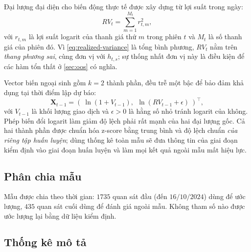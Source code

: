 \documentclass[12pt,a4paper]{article}
\numberwithin{equation}{section}
\theoremstyle{definition}
\newcommand{\Xvec}{\symbf{X}}
\begin{document}
Đại lượng đại diện cho biến động thực tế được xây dựng từ lợi suất trong ngày:
\begin{equation}
  RV_t=\sum_{m=1}^{M_t} r_{t,m}^{2},
  \label{eq:realized-variance}
\end{equation}
với $r_{t,m}$ là lợi suất logarit của thanh giá thứ $m$ trong phiên $t$ và $M_t$ là số
thanh giá của phiên đó. Vì \eqref{eq:realized-variance} là tổng bình phương, $RV_t$ nằm
trên \emph{thang phương sai}, cùng đơn vị với $h_{t,s}$; sự thống nhất đơn vị này là điều
kiện để các hàm tổn thất ở \cref{sec:oos} có nghĩa.

Vector biến ngoại sinh gồm $k=2$ thành phần, đều trễ một bậc để bảo đảm khả dụng tại thời
điểm lập dự báo:
\begin{equation}
  \Xvec_{t-1}=\left(\ \ln\!\left(1+V_{t-1}\right),\ \ \ln\!\left(RV_{t-1}+\epsilon\right)\ \right)^{\!\top},
  \label{eq:exog}
\end{equation}
với $V_{t-1}$ là khối lượng giao dịch và $\epsilon>0$ là hằng số nhỏ tránh logarit của
không. Phép biến đổi logarit làm giảm độ lệch phải rất mạnh của hai đại lượng gốc. Cả hai
thành phần được chuẩn hóa z-score bằng trung bình và độ lệch chuẩn \emph{của riêng tập
huấn luyện}; dùng thống kê toàn mẫu sẽ đưa thông tin của giai đoạn kiểm định vào giai
đoạn huấn luyện và làm mọi kết quả ngoài mẫu mất hiệu lực.

\subsection{Phân chia mẫu}\label{subsec:split}
Mẫu được chia theo thời gian: $1735$ quan sát đầu (đến $16/10/2024$) dùng để ước lượng,
$435$ quan sát cuối dùng để đánh giá ngoài mẫu. Không tham số nào được ước lượng lại bằng
dữ liệu kiểm định.

\subsection{Thống kê mô tả}\label{subsec:descriptive}
\end{document}
